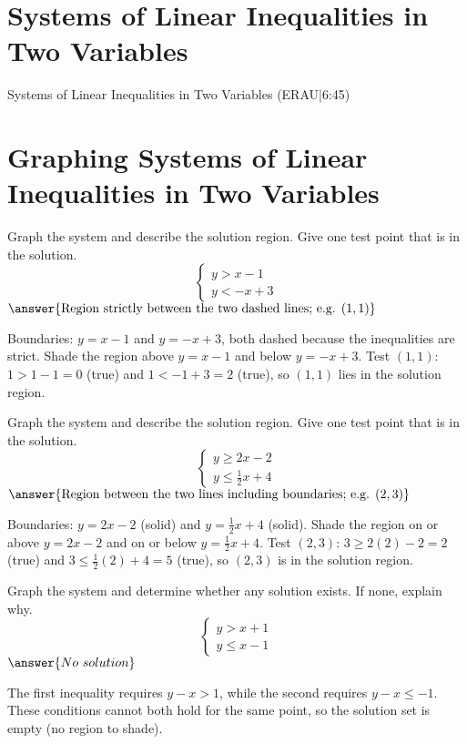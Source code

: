 \documentclass{ximera}
\begin{document}

\section*{Systems of Linear Inequalities in Two Variables}

Systems of Linear Inequalities in Two Variables (ERAU|6:45)



\section*{Graphing Systems of Linear Inequalities in Two Variables}

\begin{problem}
Graph the system and describe the solution region. Give one test point that is in the solution.
\[
\begin{cases}
y > x - 1\\[4pt]
y < -x + 3
\end{cases}
\]
$\answer{\text{Region strictly between the two dashed lines; e.g. }(1,1)}$
\begin{feedback}
Boundaries: $y=x-1$ and $y=-x+3$, both dashed because the inequalities are strict. Shade the region above $y=x-1$ and below $y=-x+3$. Test $(1,1)$: $1>1-1=0$ (true) and $1< -1+3=2$ (true), so $(1,1)$ lies in the solution region.
\end{feedback}
\end{problem}

\begin{problem}
Graph the system and describe the solution region. Give one test point that is in the solution.
\[
\begin{cases}
y \ge 2x - 2\\[4pt]
y \le \tfrac{1}{2}x + 4
\end{cases}
\]
$\answer{\text{Region between the two lines including boundaries; e.g. }(2,3)}$
\begin{feedback}
Boundaries: $y=2x-2$ (solid) and $y=\tfrac{1}{2}x+4$ (solid). Shade the region on or above $y=2x-2$ and on or below $y=\tfrac{1}{2}x+4$. Test $(2,3)$: $3\ge2(2)-2=2$ (true) and $3\le\tfrac{1}{2}(2)+4=5$ (true), so $(2,3)$ is in the solution region.
\end{feedback}
\end{problem}

\begin{problem}
Graph the system and determine whether any solution exists. If none, explain why.
\[
\begin{cases}
y > x + 1\\[4pt]
y \le x - 1
\end{cases}
\]
$\answer{No\ solution}$
\begin{feedback}
The first inequality requires $y-x>1$, while the second requires $y-x\le-1$. These conditions cannot both hold for the same point, so the solution set is empty (no region to shade).
\end{feedback}
\end{problem}
\end{document}
